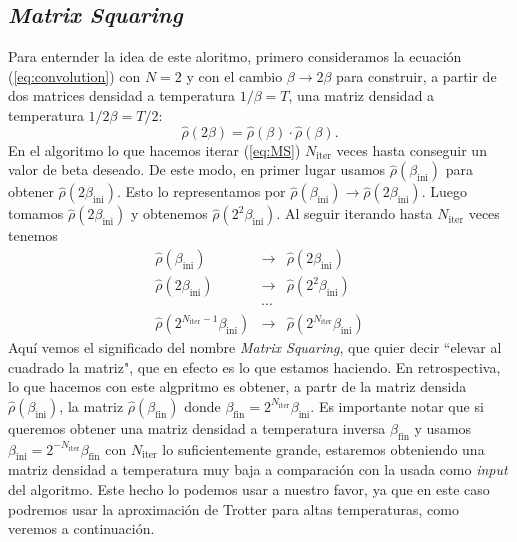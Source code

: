 \documentclass[%
 reprint,
 amsmath,amssymb,
 aps,
 pra,
]{revtex4-2}
\begin{document}
\subsection{\textit{Matrix Squaring}\label{subsec:MtxSq}}
Para enternder la idea de este aloritmo, primero consideramos la ecuación (\ref{eq:convolution}) con $ N = 2 $ y con el cambio $\beta\rightarrow2\beta$  para construir, a partir de dos matrices densidad a temperatura $ 
1 / \beta = T$, una matriz densidad a temperatura $ 1 /2 \beta = T/2 $:
\begin{equation}
\hat{\rho}(2\beta) = \hat{\rho}(\beta) \cdot \hat{\rho}(\beta). \label{eq:MS}
\end{equation}
En el algoritmo lo que hacemos iterar (\ref{eq:MS}) $N_{\mathrm{iter}}$ veces hasta conseguir un valor de beta deseado. De este modo, en primer lugar usamos $\hat{\rho}(\beta_{\mathrm{ini}})$ para obtener $\hat{\rho}(2\beta_{\mathrm{ini}})$. Esto lo representamos por $\hat{\rho}(\beta_{\mathrm{ini}}) \rightarrow \hat{\rho}(2\beta_{\mathrm{ini}})$. Luego tomamos $\hat{\rho}(2\beta_{\mathrm{ini}})$ y obtenemos $\hat{\rho}(2^2\beta_{\mathrm{ini}})$. Al seguir iterando hasta $N_{\mathrm{iter}}$ veces tenemos
\begin{eqnarray}
	\hat{\rho}(\beta_{\mathrm{ini}}) &\rightarrow& \hat{\rho}(2\beta_{\mathrm{ini}}) \nonumber \\
	\hat{\rho}(2\beta_{\mathrm{ini}}) &\rightarrow& \hat{\rho}(2^2\beta_{\mathrm{ini}}) \nonumber \\
	&\cdots& \nonumber \\
	\hat{\rho}(2^{N_{\mathrm{iter}}-1}\beta_{\mathrm{ini}}) &\rightarrow& \hat{\rho}(2^{N_{\mathrm{iter}}}\beta_{\mathrm{ini}}) \label{eq:MS-iteration-process}
\end{eqnarray}
Aquí vemos el significado del nombre \textit{Matrix Squaring}, que quier decir ``elevar al cuadrado la matriz", que en efecto es lo que estamos haciendo. En retrospectiva, lo que hacemos con este algpritmo es obtener, a partr de la matriz densida $\hat{\rho}(\beta_{\mathrm{ini}})$, la matriz $\hat{\rho}(\beta_{\mathrm{fin}})$ donde $\beta_{\mathrm{fin}}=2^{N_{\mathrm{iter}}}\beta_{\mathrm{ini}}$. Es importante notar que si queremos obtener una matriz densidad a temperatura inversa $\beta_{\mathrm{fin}}$ y usamos $\beta_{\mathrm{ini}} =  2^{-N_{\mathrm{iter}}}\beta_{\mathrm{fin}}$  con $N_{\mathrm{iter}}$ lo suficientemente grande, estaremos obteniendo una matriz densidad a temperatura muy baja a comparación con la usada como \textit{input} del algoritmo. Este hecho lo podemos usar a nuestro favor, ya que en este caso podremos usar la aproximación de Trotter para altas temperaturas, como veremos a continuación.
\end{document}
